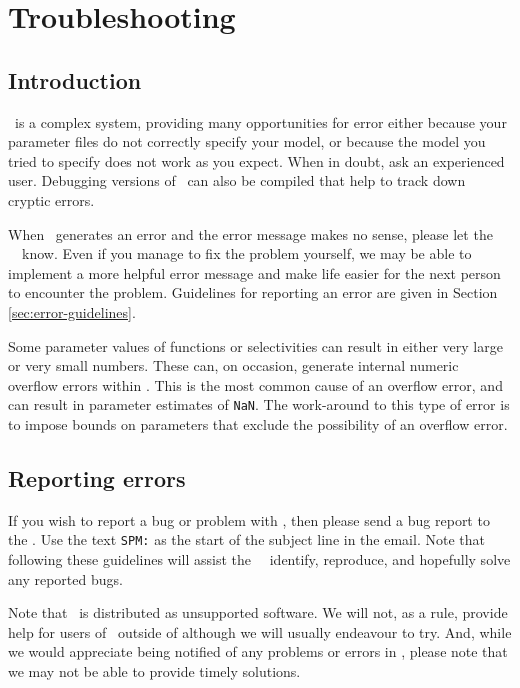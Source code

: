 \section{Troubleshooting\label{sec:trouble-shooting}}

\subsection{Introduction}

\SPM\ is a complex system, providing many opportunities for error \textemdash either because your parameter files do not correctly specify your model, or because the model you tried to specify does not work as you expect. When in doubt, ask an experienced user. Debugging versions of \SPM\ can also be compiled that help to track down cryptic errors.

When \SPM\ generates an error and the error message makes no sense, please let the \SPM\ \authors\ know. Even if you manage to fix the problem yourself, we may be able to implement a more helpful error message and make life easier for the next person to encounter the problem. Guidelines for reporting an error are given in Section \ref{sec:error-guidelines}.

Some parameter values of functions or selectivities can result in either very large or very small numbers. These can, on occasion, generate internal numeric overflow errors within \SPM. This is the most common cause of an overflow error, and can result in parameter estimates of \texttt{NaN}. The work-around to this type of error is to impose bounds on parameters that exclude the possibility of an overflow error.

\subsection{Reporting errors\label{sec:reporting-errors}}

If you wish to report a bug or problem with \SPM, then please send a bug report to the \authors. Use the text \texttt{SPM:} as the start of the subject line in the email. Note that following these guidelines will assist the \SPM\ \authors\ identify, reproduce, and hopefully solve any reported bugs. 

Note that \SPM\ is distributed as unsupported software. We will not, as a rule, provide help for users of \SPM\ outside of \href{http://www.niwa.co.nz}{\Organisation} \textemdash although we will usually endeavour to try. And, while we would appreciate being notified of any problems or errors in \SPM, please note that we may not be able to provide timely solutions.

